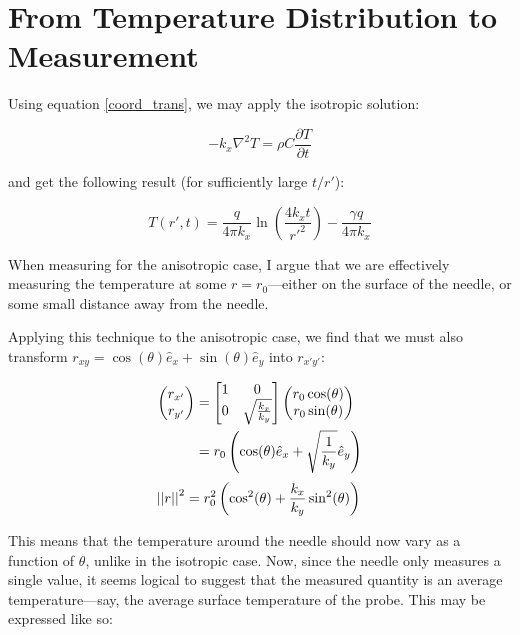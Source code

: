\section{From Temperature Distribution to Measurement}
\label{sec:analytical-np:isotropic}

Using equation \ref{coord_trans}, we may apply the isotropic solution:

\begin{equation}
    -k_x \nabla^2 T = \rho C\frac{\partial T}{\partial t}
\end{equation}

and get the following result (for sufficiently large \(t/r'\)):

\begin{equation}
T(r',t) = \frac{q}{4\pi k_x}\ln\left(\frac{4k_xt}{r'^2}\right) - \frac{\gamma q}{4\pi k_x}
\end{equation}

When measuring for the anisotropic case, I argue that we are effectively
measuring the temperature at some \(r = r_{\textrm{0}}\)---either on the surface
of the needle, or some small distance away from the needle.

Applying this technique to the anisotropic case, we find that we must also
transform \(r_{xy} = \cos(\theta) \hat{e}_x + \sin(\theta) \hat{e}_y \)
into \(r_{x'y'}\):

\begin{align*}
    \begin{pmatrix}r_{x'} \\ r_{y'}\end{pmatrix} &=
    \begin{bmatrix}1 & 0\\ 0 & \sqrt{\frac{k_x}{k_y}} \end{bmatrix}\begin{pmatrix}r_0\cos(\theta) \\ r_0\sin(\theta)\end{pmatrix}\\
    &= r_0\left(\cos(\theta) \hat{e}_x + \sqrt{\frac1{k_y}} \hat{e}_y \right)\\
\end{align*}
\begin{equation}
    \left|\left|{r}\right|\right|^2 = r_0^2 \left(\cos^2(\theta) + \frac{k_x}{k_y}\sin^2(\theta) \right)\\
\end{equation}

This means that the temperature around the needle should now vary as a function
of \(\theta\), unlike in the isotropic case. Now, since the needle only measures
a single value, it seems logical to suggest that the measured quantity is an
average temperature---say, the average surface temperature of the probe.  This
may be expressed like so:

